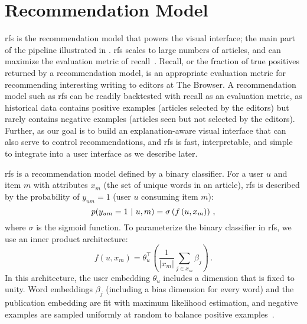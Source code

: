 \section{Recommendation Model}
\acrfull{rfs} is the recommendation model that powers the visual interface; the main part of the pipeline illustrated in . \gls{rfs} scales to large numbers of articles, and can maximize the evaluation metric of recall~\citep{altosaar2020rankfromsets:,altosaar2020probabilistic}. Recall, or the fraction of true positives returned by a recommendation model, is an appropriate evaluation metric for recommending interesting writing to editors at The Browser. A recommendation model such as \gls{rfs} can be readily backtested with recall as an evaluation metric, as historical data contains positive examples (articles selected by the editors) but rarely contains negative examples (articles seen but not selected by the editors). Further, as our goal is to build an explanation-aware visual interface that can also serve to control recommendations, and \gls{rfs} is fast, interpretable, and simple to integrate into a user interface as we describe later.

\gls{rfs} is a recommendation model defined by a binary classifier. For a user $u$ and item $m$ with attributes $x_m$ (the set of unique words in an article), \gls{rfs} is described by the probability of $y_{um} = 1$ (user $u$ consuming item $m$):
$$p(y_{um} = 1 ~\vert~ u, m) = \sigma\left( f \left (u, x_m\right) \right)\, ,$$
where $\sigma$ is the sigmoid function. To parameterize the binary classifier in \gls{rfs}, we use an inner product architecture:
\begin{equation}
\label{eq:inner-product}
  f\left(u, x_m\right) = \theta_u^\top\left(\frac{1}{|x_m|}\sum_{j\in x_m}
  \beta_j\right)\, .
\end{equation}
In this architecture, the user embedding $\theta_u$ includes a dimension that is fixed to unity. Word embeddings $\beta_j$ (including a bias dimension for every word) and the publication embedding are fit with maximum likelihood estimation, and negative examples are sampled uniformly at random to balance positive examples~\citep{altosaar2020probabilistic}.


